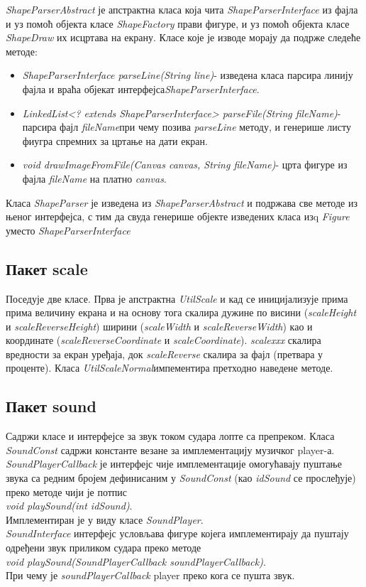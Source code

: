 \emph{ShapeParserAbstract} је апстрактна класа која чита \emph{ShapeParserInterface} из фајла и уз помоћ објекта класе \emph{ShapeFactory} прави фигуре, и уз помоћ објекта класе \emph{ShapeDraw} их исцртава на екрану. Класе које је изводе морају да подрже следеће методе:
\begin{itemize}
\item \emph{ShapeParserInterface parseLine(String line)}- изведена класа парсира линију фајла и враћа објекат интерфејса\emph{ShapeParserInterface}.
\item \emph{LinkedList<? extends ShapeParserInterface> parseFile(String fileName)}-парсира фајл \emph{fileName}при чему позива \emph{parseLine} методу, и генерише листу фиугра спремних за цртање на дати екран.
\item \emph{void drawImageFromFile(Canvas canvas, String fileName)}- црта фигуре из фајла \emph{fileName} на платно \emph{canvas}.
\end{itemize}

Класа \emph{ShapeParser} је изведена из \emph{ShapeParserAbstract} и подржава све методе из њеног интерфејса, с тим да свуда генерише објекте изведених класа изq \emph{Figure} уместо \emph{ShapeParserInterface}

\subsection{Пакет scale}
Поседује две класе. Прва је апстрактна \emph{UtilScale} и кад се иницијализује прима прима величину екрана и на основу тога скалира дужине по висини (\emph{scaleHeight} и \emph{scaleReverseHeight}) ширини (\emph{scaleWidth} и \emph{scaleReverseWidth}) као и координате (\emph{scaleReverseCoordinate} и \emph{scaleCoordinate}). \emph{scalexxx} скалира вредности за екран уређаја, док \emph{scaleReverse} скалира за фајл (претвара у проценте). Класа \emph{UtilScaleNormal}импементира претходно наведене методе.
\subsection{Пакет sound}
Садржи класе и интерфејсе за звук током судара лопте са препреком. Класа \emph{SoundConst} садржи  константе везане за имплементацију музичког player-а. \emph{SoundPlayerCallback} је интерфејс чије имплементације омогућавају пуштање звука са редним бројем дефинисаним у \emph{SoundConst} (као \emph{idSound} се прослеђује) преко методе чији је потпис 
\\  \indent \emph{void playSound(int idSound)}.\\  Имплементиран је у виду класе \emph{SoundPlayer}.
\\ \indent
\emph{SoundInterface} интерфејс условљава фигуре којега имплементирају да пуштају одређени звук приликом судара преко методе\\ \indent  \emph{void playSound(SoundPlayerCallback soundPlayerCallback)}.\\
При чему је \emph{soundPlayerCallback} player преко кога се пушта звук.

 
 